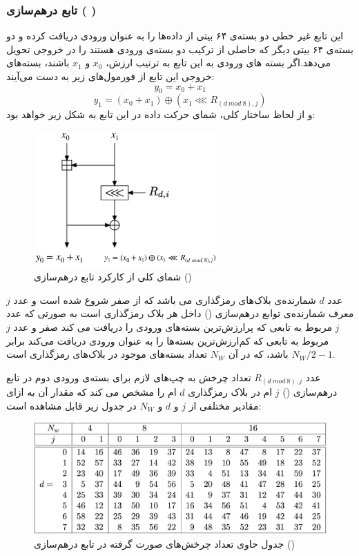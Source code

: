 \subsubsection{
تابع درهم‌سازی (
)
}
این تابع غیر خطی دو بسته‌ی ۶۴ بیتی از داده‌ها ‌را به عنوان ورودی دریافت کرده و دو بسته‌ی ۶۴ بیتی دیگر که حاصلی از ترکیب دو بسته‌ی ورودی هستند را در خروجی تحویل می‌دهد.اگر بسته های ورودی به این تابع به ترتیب ارزش، 
$x_0$ 
و
$x_1$
باشند، بسته‌های خروجی این تابع از فورمول‌های زیر به دست می‌‌آیند:
$$y_0 = x_0 + x_1$$
$$y_1 = (x_0 + x_1) \oplus ( x_1 \lll R_{(d\ mod\  8),j})$$
و از لحاظ ساختار کلی، شمای حرکت داده در این تابع به شکل زیر خواهد بود:


\begin{figure}[H]
	\centering
	\includegraphics[width=7cm]{Images/Introduction/mix_function_dataflow.png}	
	\caption{
		شمای کلی از کارکرد تابع درهم‌سازی ()
	}
\end{figure}


عدد
$d$
 شمارنده‌ی بلاک‌های رمزگذاری‌ می باشد که از صفر شروع شده است و عدد $j$ معرف شمارنده‌ی توابع درهم‌سازی () داخل هر بلاک رمزگذاری است به صورتی که  عدد $j$  مربوط به تابعی که پرارزش‌ترین بسته‌های ورودی را دریافت می کند صفر و عدد $j$ مربوط به تابعی که کم‌ارزش‌ترین بسته‌ها را به عنوان ورودی دریافت می‌کند برابر 
$N_W/2 - 1$ 
‌باشد، که در آن 
$N_W$
تعداد بسته‌های موجود در بلاک‌های رمزگذاری است.


عدد 
$ R_{(d\ mod\  8),j}$
تعداد چرخش به چپ‌های لازم برای بسته‌ی ورودی دوم در تابع درهم‌سازی () $j$ ام در بلاک رمزگذاری $d$ ام را مشخص می کند که مقدار آن  به ازای مقادیر مختلفی از 
$j$ و
$d$ و
$N_W$ 
در جدول زیر قابل مشاهده است:
  
  \begin{figure}[H]
  	\centering
  	\includegraphics[width=15cm]{Images/Introduction/mix_function_rotate_values.png}	
  	\caption{جدول حاوی تعداد چرخش‌های صورت گرفته در تابع 
  	درهم‌سازی ()
  }
  \end{figure}

